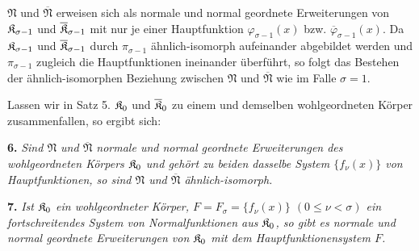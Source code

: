 $\mathfrak N$ und $\overline{\mathfrak N}$ erweisen sich als normale und normal geordnete Erweiterungen von $\mathfrak K_{\sigma-1}$ und $\overline{\mathfrak K}_{\sigma-1}$ mit nur je einer Hauptfunktion $\varphi_{\sigma-1}(x)$ bzw. $\overline\varphi_{\sigma-1}(x)$. Da $\mathfrak K_{\sigma-1}$ und $\overline{\mathfrak K}_{\sigma-1}$ durch $\pi_{\sigma-1}$ ähnlich-isomorph aufeinander abgebildet werden und $\pi_{\sigma-1}$ zugleich die Hauptfunktionen ineinander überführt, so folgt das Bestehen der ähnlich-isomorphen Beziehung zwischen $\mathfrak N$ und $\overline{\mathfrak N}$ wie im Falle $\sigma=1$.

Lassen wir in Satz 5. $\mathfrak K_0$ und $\overline{\mathfrak K}_0$ zu einem und demselben wohlgeordneten Körper zusammenfallen, so ergibt sich:

\textbf{6.} \emph{Sind $\mathfrak N$ und $\overline{\mathfrak N}$ normale und normal geordnete Erweiterungen des wohlgeordneten Körpers $\mathfrak K_0$ und gehört zu beiden dasselbe System $\{f_\nu(x)\}$ von Hauptfunktionen, so sind $\mathfrak N$ und $\overline{\mathfrak N}$ ähnlich-isomorph.}

\textbf{7.} \emph{Ist $\mathfrak K_0$ ein wohlgeordneter Körper, $F=F_\sigma=\{f_\nu(x)\}$ $(0\leq\nu<\sigma)$ ein fortschreitendes System von Normalfunktionen aus $\mathfrak K_0$, so gibt es normale und normal geordnete Erweiterungen von $\mathfrak K_0$ mit dem Hauptfunktionensystem $F$.}

